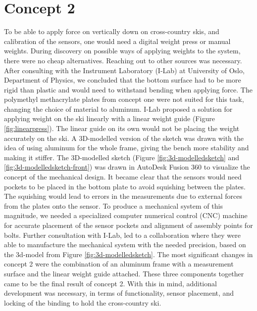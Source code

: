 \section{Concept 2}
\label{sec:concept2}
To be able to apply force on vertically down on cross-country skis, and calibration of the sensors, one would need a digital weight press or manual weights. During discovery on possible ways of applying weights to the system, there were no cheap alternatives. Reaching out to other sources was necessary.
After consulting with the Instrument Laboratory (I-Lab) at University of Oslo, Department of Physics, we concluded that the bottom surface had to be more rigid than plastic and would need to withstand bending when applying force. The polymethyl methacrylate plates from concept one were not suited for this task, changing the choice of material to aluminum.
I-Lab proposed a solution for applying weight on the ski linearly with a linear weight guide (Figure \ref{fig:linearpress}). The linear guide on its own would not be placing the weight accurately on the ski. A 3D-modelled version of the sketch was drawn with the idea of using aluminum for the whole frame, giving the bench more stability and making it stiffer. The 3D-modelled sketch (Figure \ref{fig:3d-modelledsketch} and \ref{fig:3d-modelledsketch-front}) was drawn in AutoDesk Fusion 360 to visualize the concept of the mechanical design. It became clear that the sensors would need pockets to be placed in the bottom plate to avoid squishing between the plates. The squishing would lead to errors in the measurements due to external forces from the plates onto the sensor.
To produce a mechanical system of this magnitude, we needed a specialized computer numerical control (CNC) machine for accurate placement of the sensor pockets and alignment of assembly points for bolts. Further consultation with I-Lab, led to a collaboration where they were able to manufacture the mechanical system with the needed precision, based on the 3d-model from Figure \ref{fig:3d-modelledsketch}.
The most significant changes in concept 2 were the combination of an aluminum frame with a measurement surface and the linear weight guide attached. These three components together came to be the final result of concept 2. With this in mind, additional development was necessary, in terms of functionality, sensor placement, and locking of the binding to hold the cross-country ski.

